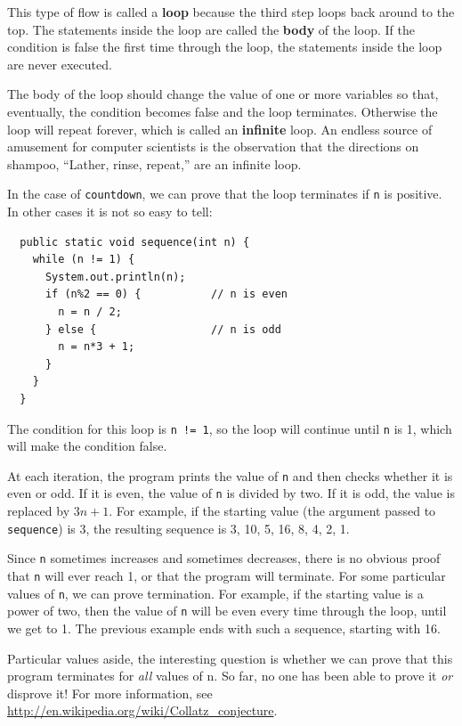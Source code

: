 This type of flow is called a {\bf loop} because the third step loops
back around to the top.  The statements inside the loop are called
the {\bf body} of the loop.
%
If the condition is false the
first time through the loop, the statements inside the loop are
never executed.


The body of the loop should change the value of
one or more variables so that, eventually, the condition becomes
false and the loop terminates.  Otherwise the loop will repeat
forever, which is called an {\bf infinite} loop.  An endless
source of amusement for computer scientists is the observation
that the directions on shampoo, ``Lather, rinse, repeat,'' are
an infinite loop.

In the case of {\tt countdown}, we can prove that the loop
terminates if {\tt n} is positive.
%
In other cases it is not so easy to tell:

\begin{lstlisting}
  public static void sequence(int n) {
    while (n != 1) {
      System.out.println(n);
      if (n%2 == 0) {           // n is even
        n = n / 2;
      } else {                  // n is odd
        n = n*3 + 1;
      }
    }
  }
\end{lstlisting}
%
The condition for this loop is {\tt n != 1}, so the loop
will continue until {\tt n} is 1, which will make the condition
false.

At each iteration, the program prints the value of {\tt n} and then
checks whether it is even or odd.  If it is even, the value of
{\tt n} is divided by two.  If it is odd, the value is replaced
by $3n+1$.  For example, if the starting value (the argument passed
to {\tt sequence}) is 3, the resulting sequence is
3, 10, 5, 16, 8, 4, 2, 1.

Since {\tt n} sometimes increases and sometimes decreases, there is no
obvious proof that {\tt n} will ever reach 1, or that the program will
terminate.  For some particular values of {\tt n}, we can prove
termination.  For example, if the starting value is a power of two, then
the value of {\tt n} will be even every time through the loop, until
we get to 1.  The previous example ends with such a sequence,
starting with 16.

Particular values aside, the interesting question is whether
we can prove that this program terminates for {\em all} values of n.
So far, no one has been able to prove it {\em or} disprove it!
For more information, see \url{http://en.wikipedia.org/wiki/Collatz_conjecture}.


